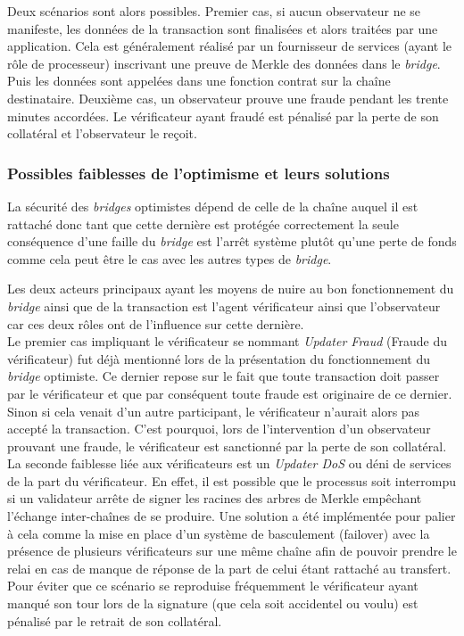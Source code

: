 Deux scénarios sont alors possibles. Premier cas, si aucun observateur ne se manifeste, les données de la transaction sont finalisées et alors traitées par une application. Cela est généralement réalisé par un fournisseur de services (ayant le rôle de processeur) inscrivant une preuve de Merkle des données dans le \textit{bridge}. Puis les données sont appelées dans une fonction contrat sur la chaîne destinataire. Deuxième cas, un observateur prouve une fraude pendant les trente minutes accordées. Le vérificateur ayant fraudé est pénalisé par la perte de son collatéral et l’observateur le reçoit.

\subsubsection{Possibles faiblesses de l’optimisme et leurs solutions}

La sécurité des \textit{bridges} optimistes dépend de celle de la chaîne auquel il est rattaché donc tant que cette dernière est protégée correctement la seule conséquence d’une faille du \textit{bridge} est l’arrêt système plutôt qu’une perte de fonds comme cela peut être le cas avec les autres types de \textit{bridge}.

Les deux acteurs principaux ayant les moyens de nuire au bon fonctionnement du \textit{bridge} ainsi que de la transaction est l’agent vérificateur ainsi que l’observateur car ces deux rôles ont de l’influence sur cette dernière. \\

Le premier cas impliquant le vérificateur se nommant \textit{Updater Fraud} (Fraude du vérificateur)  fut déjà mentionné lors de la présentation du fonctionnement du \textit{bridge} optimiste. Ce dernier repose sur le fait que toute transaction doit passer par le vérificateur et que par conséquent toute fraude est originaire de ce dernier. Sinon si cela venait d’un autre participant, le vérificateur n’aurait alors pas accepté la transaction. C’est pourquoi, lors de l’intervention d’un observateur prouvant une fraude, le vérificateur est sanctionné par la perte de son collatéral. \\

La seconde faiblesse liée aux vérificateurs est un \textit{Updater DoS} ou déni de services de la part du vérificateur. En effet, il est possible que le processus soit interrompu si un validateur arrête de signer les racines des arbres de Merkle empêchant l'échange inter-chaînes de se produire.
Une solution a été implémentée pour palier à cela comme la mise en place d’un système de basculement (failover) avec la présence de plusieurs vérificateurs sur une même chaîne afin de pouvoir prendre le relai en cas de manque de réponse de la part de celui étant rattaché au transfert.  Pour éviter que ce scénario se reproduise fréquemment le vérificateur ayant manqué son tour lors de la signature (que cela soit accidentel ou voulu) est pénalisé par le retrait de son collatéral. \\

